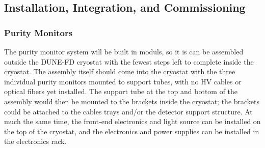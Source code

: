 




\subsection{Installation, Integration, and Commissioning}


\subsubsection{Purity Monitors}
\label{sec:fdgen-slow-cryo-instal-pm}


The purity monitor system will be built in moduls, so it is can be assembled outside the DUNE-FD cryostat  
with the fewest steps left to complete inside the cryostat.  The assembly itself should come into the cryostat with the three individual purity monitors mounted to support tubes, with no HV cables or optical fibers yet installed.  The support tube at the top and bottom of the assembly would then be mounted to the brackets inside the cryostat; the brackets could be attached to the cables trays and/or the detector support structure.  At much the same time, the front-end electronics and light source can be installed on the top of the cryostat, and the electronics and power supplies can be installed in the electronics rack.  

